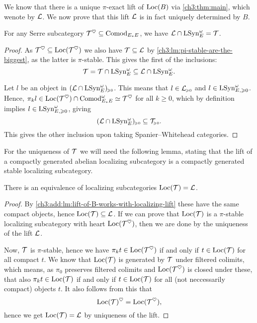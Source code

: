 We know that there is a unique $\pi$-exact lift of $\operatorname{Loc}(B)$ via \cref{ch3:thm:main}, which wenote by $\mathcal{L}$. We now prove that this lift $\mathcal{L}$ is in fact uniquely determined by $B$. 

\begin{lemma}
    \label{ch3:add:lm:lift-of-B-works-with-localizing-lift}
    For any Serre subcategory $\mathcal{T}^\heartsuit\subseteq \mathrm{Comod}_{E_*E}$, we have $\mathcal{L}\cap \mathrm{LSyn}_{E}^\omega = \mathcal{T}$. 
\end{lemma}
\begin{proof}
    As $\mathcal{T}^\heartsuit \subseteq \operatorname{Loc}(\mathcal{T}^\heartsuit)$ we also have $\mathcal{T} \subseteq \mathcal{L}$ by \cref{ch3:lm:pi-stable-are-the-biggest}, as the latter is $\pi$-stable. This gives the first of the inclusions:
    \[\mathcal{T} = \mathcal{T} \cap \mathrm{LSyn}_{E}^\omega\subseteq \mathcal{L} \cap \mathrm{LSyn}_{E}^\omega.\]
    
    Let $l$ be an object in $(\mathcal{L}\cap \mathrm{LSyn}_{E}^\omega)_{\hspace{-1pt}\scriptscriptstyle\geqslant 0}$. This means that $l\in \mathcal{L}_{\hspace{-1pt}\scriptscriptstyle\geqslant 0}$ and $l \in \mathrm{LSyn}_{E, \geqslant 0}^\omega$. Hence, $\pi_k l \in \operatorname{Loc}(\mathcal{T}^\heartsuit)\cap \mathrm{Comod}_{E_*E}^\omega \simeq \mathcal{T}^\heartsuit$ for all $k\geq 0$, which by definition implies $l \in \mathrm{LSyn}_{E, \geqslant 0}^\omega$, giving 
    \[(\mathcal{L}\cap \mathrm{LSyn}_{E}^\omega)_{\hspace{-1pt}\scriptscriptstyle\geqslant 0} \subseteq \mathcal{T}_{\hspace{-1pt}\scriptscriptstyle\geqslant 0}.\]
    This gives the other inclusion upon taking Spanier--Whitehead categories. 
\end{proof}


For the uniqueness of $\mathcal{T}$ we will need the following lemma, stating that the lift of a compactly generated abelian localizing subcategory is a compactly generated stable localizing subcategory. 

\begin{lemma}
    \label{ch3:add:lm:loc-of-lift-is-localizing-lift}
    There is an equivalence of localizing subcategories $\operatorname{Loc}(\mathcal{T}) = \mathcal{L}$. 
\end{lemma}
\begin{proof}
    By \cref{ch3:add:lm:lift-of-B-works-with-localizing-lift} these have the same compact objects, hence $\operatorname{Loc}(\mathcal{T})\subseteq \mathcal{L}$. If we can prove that $\operatorname{Loc}(\mathcal{T})$ is a $\pi$-stable localizing subcategory with heart $\operatorname{Loc}(\mathcal{T}^\heartsuit)$, then we are done by the uniqueness of the lift $\mathcal{L}$. 

    Now, $\mathcal{T}$ is $\pi$-stable, hence we have $\pi_k t \in \operatorname{Loc}(\mathcal{T}^\heartsuit)$ if and only if $t\in \operatorname{Loc}(\mathcal{T})$ for all compact $t$. We know that $\operatorname{Loc}(\mathcal{T})$ is generated by $\mathcal{T}$ under filtered colimits, which means, as $\pi_0$ preserves filtered colimits and $\operatorname{Loc}(\mathcal{T}^\heartsuit)$ is closed under these, that also $\pi_k t\in \operatorname{Loc}(\mathcal{T})$ if and only if $t\in \operatorname{Loc}(\mathcal{T})$ for all (not neccessarily compact) objects $t$. It also follows from this that 
    \[\operatorname{Loc}(\mathcal{T})^\heartsuit = \operatorname{Loc}(\mathcal{T}^\heartsuit),\]
    hence we get $\operatorname{Loc}(\mathcal{T}) = \mathcal{L}$ by uniqueness of the lift. 
\end{proof}

